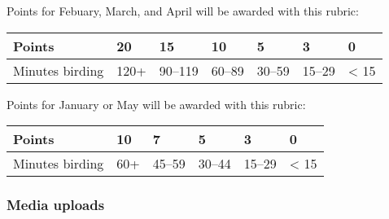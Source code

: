 \documentclass[12pt]{article}
\begin{document}
\begin{itemize}
Points for Febuary, March, and April will be awarded with this rubric:

\begin{tabular}{L{1.5cm}C{1.2cm}C{1.2cm}C{1.2cm}C{1.2cm}C{1.2cm}C{1.2cm}}
\toprule
Points & 20 & 15 & 10 & 5 & 3 & 0 \tabularnewline
\midrule
Minutes birding & 120+ & 90–119 & 60–89 & 30–59 & 15–29 & < 15 \tabularnewline
\bottomrule
\end{tabular}

\bigskip

Points for January or May will be awarded with this rubric:

\begin{tabular}{L{1.5cm}C{1.2cm}C{1.2cm}C{1.2cm}C{1.2cm}C{1.2cm}}
\toprule
Points & 10 & 7 & 5 & 3 & 0 \tabularnewline
\midrule
Minutes birding & 60+ & 45–59 & 30–44 & 15–29 & < 15 \tabularnewline
\bottomrule
\end{tabular}
\end{itemize}

\subsubsection*{Media uploads}
\end{document}

